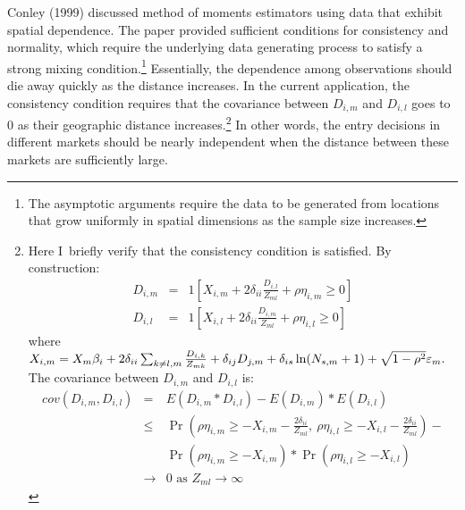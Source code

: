 \documentclass[notitlepage,onecolumn,11pt]{article}
\begin{document}
Conley (1999) discussed method of moments estimators using data that exhibit
spatial dependence. The paper provided sufficient conditions for consistency
and normality, which require the underlying data generating process to
satisfy a strong mixing condition.\footnote{%
The asymptotic arguments require the data to be generated from locations
that grow uniformly in spatial dimensions as the sample size increases.}
Essentially, the dependence among observations should die away quickly as
the distance increases. In the current application, the consistency
condition requires that the covariance between $D_{i,m}$ and $D_{i,l}$ goes
to $0$ as their geographic distance increases.\footnote{%
Here I\ briefly verify that the consistency condition is satisfied. By
construction:%
\begin{eqnarray*}
D_{i,m} &=&1[X_{i,m}+2\delta _{ii}\frac{D_{i,l}}{Z_{ml}}+\rho \eta
_{i,m}\geq 0] \\
D_{i,l} &=&1[X_{i,l}+2\delta _{ii}\frac{D_{i,m}}{Z_{ml}}+\rho \eta
_{i,l}\geq 0]
\end{eqnarray*}%
where $X_{i,m}=X_{m}\beta _{i}+2\delta _{ii}\sum_{k\neq l,m}\frac{D_{i,k}}{%
Z_{mk}}+\delta _{ij}D_{j,m}+\delta _{is}\ln (N_{s,m}+1)+\sqrt{1-\rho ^{2}}%
\varepsilon _{m}.$ The covariance between $D_{i,m}$ and $D_{i,l}$ is:%
\begin{eqnarray*}
cov(D_{i,m},D_{i,l}) &=&E(D_{i,m}\ast D_{i,l})-E(D_{i,m})\ast E(D_{i,l}) \\
&\leq &\Pr (\rho \eta _{i,m}\geq -X_{i,m}-\frac{2\delta _{ii}}{Z_{ml}},~\rho
\eta _{i,l}\geq -X_{i,l}-\frac{2\delta _{ii}}{Z_{ml}})- \\
&&\Pr (\rho \eta _{i,m}\geq -X_{i,m})\ast \Pr (\rho \eta _{i,l}\geq -X_{i,l})
\\
&\rightarrow &0\text{ as }Z_{ml}\rightarrow \infty
\end{eqnarray*}%
} In other words, the entry decisions in different markets should be nearly
independent when the distance between these markets are sufficiently large.
\end{document}
